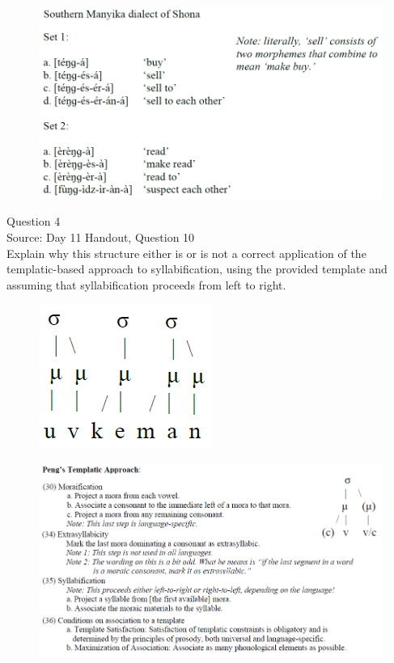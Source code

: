 \documentclass[12pt]{article}
\begin{document}
\begin{figure}[H]
\includegraphics{../images/shona.png}
\end{figure}

\newpage

{\large Question 4}\\

Source: Day 11 Handout, Question 10\\

Explain why this structure either is or is not a correct application of the templatic-based approach to syllabification, using the provided template and assuming that syllabification proceeds from left to right.\\

\begin{figure}[H]
\includegraphics{../images/pengtemplate_uvkeman_no.png}
\end{figure}
\begin{figure}[H]
\includegraphics{../images/peng_template_withdiagram.png}
\end{figure}
\end{document}

